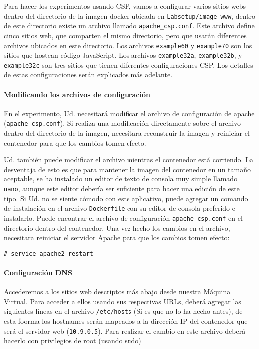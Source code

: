 Para hacer los experimentos usando CSP, vamos a configurar varios sitios webs dentro del directorio de la imagen docker ubicada en \texttt{Labsetup/image\_www}, dentro de este directorio existe un archivo llamado \texttt{apache\_csp.conf}. 
Este archivo define cinco sitios web, que comparten el mismo directorio, pero que usarán diferentes archivos ubicados en este directorio.
Los archivos \texttt{example60} y \texttt{example70} son los sitios que hostean código JavaScript.
Los archivos \texttt{example32a}, \texttt{example32b}, y 
\texttt{example32c} son tres sitios que tienen diferentes configuraciones CSP. Los detalles de estas configuraciones serán explicados más adelante.


\paragraph{Modificando los archivos de configuración}
En el experimento, Ud. necesitará modificar el archivo de configuración de apache (\texttt{apache\_csp.conf}). Si realiza una modificación directamente sobre el archivo dentro del directorio de la imagen, necesitara reconstruir la imagen y reiniciar el contenedor para que los cambios tomen efecto.

Ud. también puede modificar el archivo mientras el contenedor está corriendo. La desventaja de esto es que para mantener la imagen del contenedor en un tamaño aceptable, se ha instalado un editor de texto de consola muy simple llamado \texttt{nano}, aunque este editor debería ser suficiente para hacer una edición de este tipo. Si Ud. no se siente cómodo con este aplicativo, puede agregar un comando de instalación en el archivo \texttt{Dockerfile} con su editor de consola preferido e instalarlo.
Puede encontrar el archivo de configuración \texttt{apache\_csp.conf} en el directorio  dentro del contenedor.
Una vez hecho los cambios en el archivo, necesitara reiniciar el servidor Apache para que los cambios tomen efecto:

\begin{lstlisting}
# service apache2 restart
\end{lstlisting}


\paragraph{Configuración DNS}
Accederemos a los sitios web descriptos más abajo desde nuestra Máquina Virtual. 
Para acceder a ellos usando sus respectivas URLs, deberá agregar las siguientes líneas en el archivo \texttt{/etc/hosts} (Si es que no lo ha hecho antes), de esta foorma los hostnames serán mapeados a la dirección IP del contenedor que será el servidor web (\texttt{10.9.0.5}). 
Para realizar el cambio en este archivo deberá hacerlo con privilegios de root (usando sudo)

